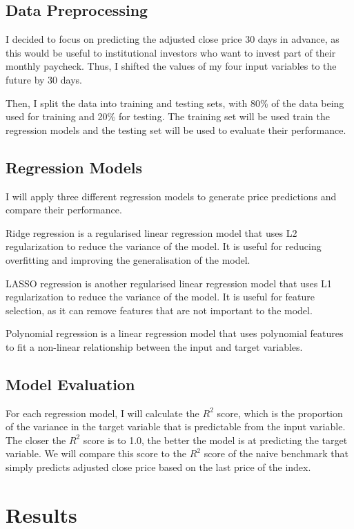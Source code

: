 \documentclass[a4paper, 11pt]{article}
\begin{document}
\subsection{Data Preprocessing}
I decided to focus on predicting the adjusted close price 30 days in advance, as this would be useful to institutional investors who want to invest part of their monthly paycheck. Thus, I shifted the values of my four input variables to the future by 30 days.

Then, I split the data into training and testing sets, with 80\% of the data being used for training and 20\% for testing. The training set will be used train the regression models and the testing set will be used to evaluate their performance.

\subsection{Regression Models}
I will apply three different regression models to generate price predictions and compare their performance.

Ridge regression is a regularised linear regression model that uses L2 regularization to reduce the variance of the model. It is useful for reducing overfitting and improving the generalisation of the model.

LASSO regression is another regularised linear regression model that uses L1 regularization to reduce the variance of the model. It is useful for feature selection, as it can remove features that are not important to the model.

Polynomial regression is a linear regression model that uses polynomial features to fit a non-linear relationship between the input and target variables.

\subsection{Model Evaluation}
For each regression model, I will calculate the $R^2$ score, which is the proportion of the variance in the target variable that is predictable from the input variable. The closer the $R^2$ score is to 1.0, the better the model is at predicting the target variable. We will compare this score to the $R^2$ score of the naive benchmark that simply predicts adjusted close price based on the last price of the index.

\section{Results}
\end{document}
